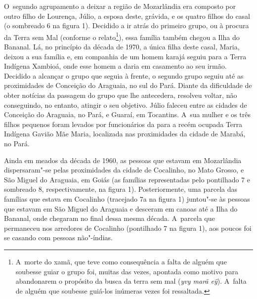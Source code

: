 O~segundo agrupamento a deixar a região de Mozarlândia era composto por
outro filho de Lourença, Júlio, a esposa deste, grávida, e os quatro
filhos do casal (o sombreado 6 na figura 1). Decidido a ir atrás do
primeiro grupo, ou à procura da Terra sem Mal (conforme o
relato\footnote{A~morte do xamã, que teve como consequência a falta de
alguém que soubesse guiar o grupo foi, muitas das vezes, apontada como
motivo para abandonarem o propósito da busca da terra sem mal (\emph{yvy marã
eÿ}). A~falta de alguém que soubesse guiá-los inúmeras vezes foi
ressaltada.}), essa família também chegou a Ilha do Bananal. Lá, no
princípio da década de 1970, a única filha deste casal, Maria, deixou a
sua família e, em companhia de um homem karajá seguiu para a Terra
Indígena Xambioá, onde esse homem a daria em casamento ao seu irmão.
Decidido a alcançar o grupo que seguia à frente, o segundo grupo seguiu
até as proximidades de Conceição do Araguaia, no sul do Pará. Diante da
dificuldade de obter notícias da passagem do grupo que lhe antecedera,
resolveu voltar, não conseguindo, no entanto, atingir o seu objetivo.
Júlio faleceu entre as cidades de Conceição do Araguaia, no Pará, e
Guaraí, em Tocantins. A~sua mulher e os três filhos pequenos foram
levados por funcionários da  para a recém ocupada Terra Indígena
Gavião Mãe Maria, localizada nas proximidades da cidade de Marabá, no
Pará. 

Ainda em meados da década de 1960, as pessoas que estavam em Mozarlândia
dispersaram"-se pelas proximidades da cidade de Cocalinho, no Mato
Grosso, e São Miguel do Araguaia, em Goiás (as famílias representadas
pelo pontilhado 7 e sombreado 8, respectivamente, na figura 1).
Posteriormente, uma parcela das famílias que estava em Cocalinho
(tracejado 7a na figura 1) juntou"-se às pessoas que estavam em São
Miguel do Araguaia e desceram em canoas até a Ilha do Bananal, onde
chegaram no final dessa mesma década. A~parcela que permaneceu nos
arredores de Cocalinho (pontilhado 7 na figura 1), aos poucos foi se
casando com pessoas não"-índias. 



